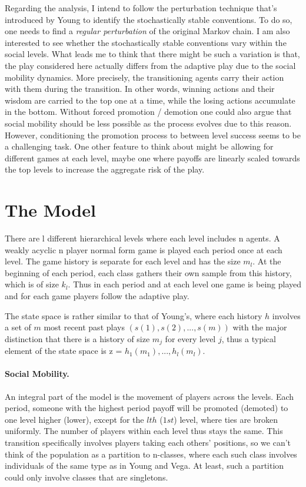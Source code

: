 \documentclass[11pt, a4paper, leqno]{article}
\begin{document}
Regarding the analysis, I intend to follow the perturbation technique that's introduced by Young to identify the stochastically stable conventions. To do so, one needs to find a \textit{regular perturbation} of the original Markov chain. I am also interested to see whether the stochastically stable conventions vary within the social levels. What leads me to think that there might be such a variation is that, the play considered here actually differs from the adaptive play due to the social mobility dynamics. More precisely, the transitioning agents   carry their action with them during the transition. In other words, winning actions and their wisdom are carried to the top one at a time, while the losing actions accumulate in the bottom. Without forced promotion / demotion one could also argue that social mobility should be less possible as the process evolves due to this reason. However, conditioning the promotion process to between level success seems to be a challenging task. One other feature to think about might be allowing for different games at each level, maybe one where payoffs are linearly scaled towards the top levels to increase the aggregate risk of the play.

\section*{The Model}
There are l different hierarchical levels where each level includes n agents. A weakly acyclic n player normal form game is played each period once at each level. The game history is separate for each level and has the size $m_l$. At the beginning of each period, each class gathers their own sample from this history, which is of size $k_l$. Thus in each period and at each level one game is being played and for each game players follow the adaptive play. 

The state space is rather similar to that of Young's, where each history $h$ involves a set of $m$ most recent past plays $(s(1), s(2),...,s(m))$ with the major distinction that there is a history of size $m_j$ for every level $j$, thus a typical element of the state space is z = $h_1(m_1),...,h_l(m_l)$. 

\paragraph{Social Mobility.}

An integral part of the model is the movement of players across the levels. Each period, someone with the highest period payoff will be promoted (demoted) to one level higher (lower), except for the $lth$ ($1st$) level, where ties are broken uniformly. The number of players within each level thus stays the same. This transition specifically involves players taking each others' positions, so we can't think of the population as a partition to n-classes, where each such class involves individuals of the same type as in Young and Vega. At least, such a partition could only involve classes that are singletons. 
\end{document}
